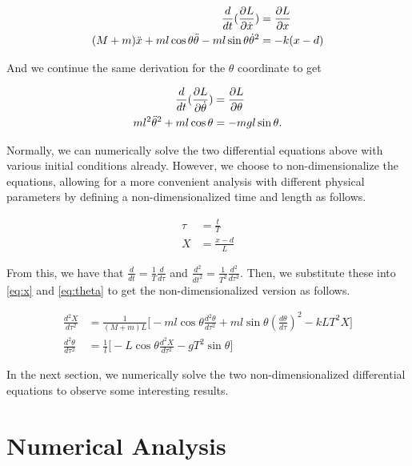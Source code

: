 \documentclass[12pt]{article}
\begin{document}
\begin{align}
        \frac{d}{dt} (\frac{\partial L}{\partial \dot{x}}) &= \frac{\partial L}{\partial x} \\
    (M+m)\Ddot{x} + ml\cos{\theta}\Ddot{\theta} - ml\sin{\theta}\dot{\theta}^2 &= 
     -k(x-d) \label{eq:x}
\end{align}
     
And we continue the same derivation for the $\theta$ coordinate to get

\begin{align}
    \frac{d}{dt} (\frac{\partial L}{\partial \dot{\theta}}) &= \frac{\partial L}{\partial \theta} \\
    ml^2\Ddot{\theta}^2 + ml\cos{\theta} &= -mgl\sin{\theta} \label{eq:theta}.
\end{align}

Normally, we can numerically solve the two differential equations above with various initial conditions already. However, we choose to non-dimensionalize the equations, allowing for a more convenient analysis with different physical parameters by defining a non-dimensionalized time and length as follows.

\begin{align}
    \tau &= \frac{t}{T} \label{eq:tau} \\
    X &= \frac{x-d}{L} \label{eq:X}
\end{align}

From this, we have that $\frac{d}{dt} = \frac{1}{T} \frac{d}{d\tau}$ and $\frac{d^2}{dt^2} = \frac{1}{T^2} \frac{d^2}{d\tau^2}$. Then, we substitute these into \autoref{eq:x} and \autoref{eq:theta} to get the non-dimensionalized version as follows.

\begin{align}
    \frac{d^2X}{d\tau^2} &= \frac{1}{(M+m)L} \big[ -ml\cos{\theta} \frac{d^2\theta}{d\tau^2} + ml\sin{\theta}(\frac{d\theta}{d\tau})^2 - kLT^2X \big] \label{eq:nond_X} \\
    \frac{d^2\theta}{d\tau^2} &= \frac{1}{l} \big[ -L\cos{\theta}\frac{d^2X}{d\tau^2} - gT^2\sin{\theta} \big] \label{eq:nond_theta}
\end{align}

In the next section, we numerically solve the two non-dimensionalized differential equations to observe some interesting results.

\section{Numerical Analysis}
\end{document}
